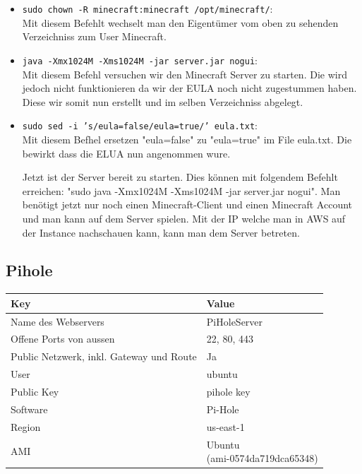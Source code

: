 \documentclass{article}
\begin{document}
\begin{itemize}
\item \texttt{sudo chown -R minecraft:minecraft /opt/minecraft/}: \\ 
Mit diesem Befehlt wechselt man den Eigentümer vom oben zu sehenden Verzeichniss zum User Minecraft. 

\item \texttt{java -Xmx1024M -Xms1024M -jar server.jar nogui}: \\ 
Mit diesem Befehl versuchen wir den Minecraft Server zu starten. Die wird jedoch nicht funktionieren da wir der EULA noch nicht zugestummen haben. Diese wir somit nun erstellt und im selben Verzeichniss abgelegt.

\item \texttt{sudo sed -i 's/eula=false/eula=true/' eula.txt}: \\ 
Mit diesem Befhel ersetzen "eula=false" zu "eula=true" im File eula.txt. Die bewirkt dass die ELUA nun angenommen wure.

\vspace{30pt}

Jetzt ist der Server bereit zu starten. Dies können mit folgendem Befehlt erreichen: "sudo java -Xmx1024M -Xms1024M -jar server.jar nogui". Man benötigt jetzt nur noch einen Minecraft-Client und einen Minecraft Account und man kann auf dem Server spielen. 
Mit der IP welche man in AWS auf der Instance nachschauen kann, kann man dem Server betreten.
\end{itemize}
\clearpage


\subsection{Pihole}

\begin{center}

\begin{tabular}{|l|l|}
\hline
\textbf{Key} & \textbf{Value} \\ \hline
Name des Webservers & PiHoleServer \\ \hline
Offene Ports von aussen & 22, 80, 443 \\ \hline
Public Netzwerk, inkl. Gateway und Route & Ja \\ \hline
User & ubuntu \\ \hline
Public Key & pihole key \\ \hline
Software & Pi-Hole \\ \hline
Region & us-east-1 \\ \hline
AMI & \makecell{Ubuntu  \\ (ami-0574da719dca65348)} \\ \hline
\end{tabular}

\end{center}
\end{document}
